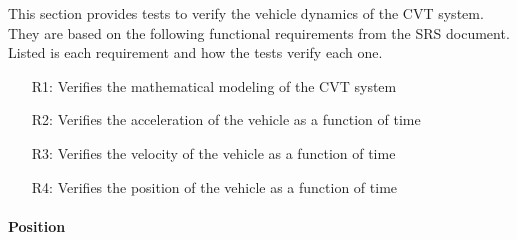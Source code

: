 \documentclass[12pt, titlepage]{article}
\begin{document}

This section provides tests to verify the vehicle dynamics of the CVT system.
They are based on the following functional requirements from the SRS document.
Listed is each requirement and how the tests verify each one.
\begin{itemize}
  \item [R1:] Verifies the mathematical modeling of the CVT system
  \item [R2:] Verifies the acceleration of the vehicle as a function of time
  \item [R3:] Verifies the velocity of the vehicle as a function of time
  \item [R4:] Verifies the position of the vehicle as a function of time
\end{itemize}

\paragraph{Position}
\end{document}

